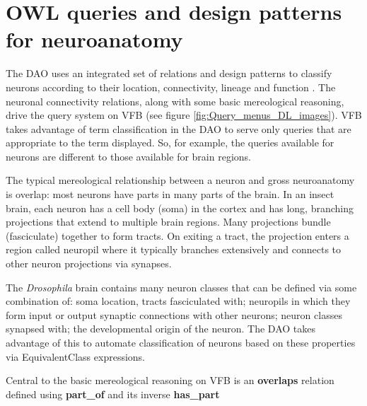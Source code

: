 \documentclass[runningheads,a4paper]{llncs}
\begin{document}


  

\section{OWL queries and design patterns for neuroanatomy} 

The DAO uses an integrated set of relations and design patterns to
classify neurons according to their location, connectivity, lineage
and function \cite{pmid22180411,pmid22402613}.  The neuronal
connectivity relations, along with some basic mereological reasoning,
drive the query system on VFB (see figure
\ref{fig:Query_menus_DL_images}). VFB takes advantage of term
classification in the DAO to serve only queries that are
appropriate to the term displayed. So, for example, the queries
available for neurons are different to those available for brain regions.

The typical mereological relationship between a neuron and gross
neuroanatomy is overlap:  most neurons have parts in many
parts of the brain.  In an insect brain, each neuron has a cell body
(soma) in the cortex and has long, branching projections that extend
to multiple brain regions.  Many projections bundle (fasciculate)
together to form tracts.  On exiting a tract, the projection enters a
region called neuropil where it typically branches extensively and
connects to other neuron projections via synapses.

The \textit{Drosophila} brain contains many neuron classes that can be
defined via some combination of: soma location, tracts fasciculated
with; neuropils in which they form input or output synaptic
connections with other neurons; neuron classes synapsed with; the
developmental origin of the neuron.  The DAO takes advantage of this
to automate classification of neurons based on these properties via
EquivalentClass expressions.

Central to the basic mereological reasoning on VFB is an
\textbf{overlaps} relation defined using \textbf{part\_of} and its
inverse \textbf{has\_part} 
\end{document}
